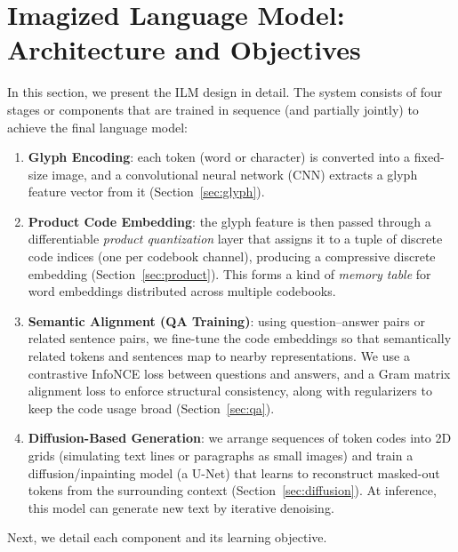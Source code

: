 \documentclass[10pt,twocolumn]{article}
\begin{document}
\section{Imagized Language Model: Architecture and Objectives}
In this section, we present the ILM design in detail. The system consists of four stages or components that are trained in sequence (and partially jointly) to achieve the final language model: 
\begin{enumerate}
    \item \textbf{Glyph Encoding}: each token (word or character) is converted into a fixed-size image, and a convolutional neural network (CNN) extracts a glyph feature vector from it (Section~\ref{sec:glyph}).
    \item \textbf{Product Code Embedding}: the glyph feature is then passed through a differentiable \emph{product quantization} layer that assigns it to a tuple of discrete code indices (one per codebook channel), producing a compressive discrete embedding (Section~\ref{sec:product}). This forms a kind of \emph{memory table} for word embeddings distributed across multiple codebooks.
    \item \textbf{Semantic Alignment (QA Training)}: using question--answer pairs or related sentence pairs, we fine-tune the code embeddings so that semantically related tokens and sentences map to nearby representations. We use a contrastive InfoNCE loss between questions and answers, and a Gram matrix alignment loss to enforce structural consistency, along with regularizers to keep the code usage broad (Section~\ref{sec:qa}).
    \item \textbf{Diffusion-Based Generation}: we arrange sequences of token codes into 2D grids (simulating text lines or paragraphs as small images) and train a diffusion/inpainting model (a U-Net) that learns to reconstruct masked-out tokens from the surrounding context (Section~\ref{sec:diffusion}). At inference, this model can generate new text by iterative denoising.
\end{enumerate}

Next, we detail each component and its learning objective.
\end{document}
